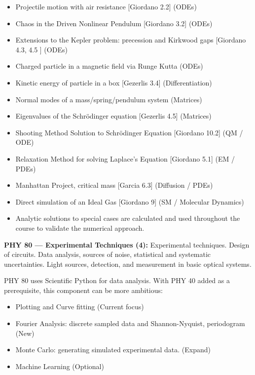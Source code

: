 \documentclass[12pt]{article}
\begin{document}
\begin{itemize}
\item Projectile motion with air resistance [Giordano 2.2] (ODEs)
\item Chaos in the Driven Nonlinear Pendulum [Giordano 3.2] (ODEs) 
\item Extensions to the Kepler problem:  precession and Kirkwood gaps [Giordano 4.3, 4.5 ] (ODEs)
\item Charged particle in a magnetic field via Runge Kutta  (ODEs)
\item Kinetic energy of particle in a box [Gezerlis 3.4] (Differentiation)
\item Normal modes of a mass/spring/pendulum system (Matrices)  
\item Eigenvalues of the Schr\"odinger equation [Gezerlis 4.5] (Matrices)
\item Shooting Method Solution to Schr\"odinger Equation [Giordano 10.2] (QM / ODE)
\item Relaxation Method for solving Laplace's Equation [Giordano 5.1] (EM / PDEs)
\item Manhattan Project, critical mass [Garcia 6.3] (Diffusion / PDEs)
\item Direct simulation of an Ideal Gas [Giordano 9] (SM / Molecular Dynamics)
\item Analytic solutions to special cases are calculated and used throughout the
  course to validate the numerical approach.
\end{itemize}  

\vskip 1cm
\noindent
{\bf PHY 80 --- Experimental Techniques (4):}
Experimental techniques. Design of circuits. Data analysis, sources of
noise, statistical and systematic uncertainties. Light sources,
detection, and measurement in basic optical systems.

PHY 80 uses Scientific Python for data analysis.  With PHY 40 added as
a prerequisite, this component can be more ambitious:
\begin{itemize}
\item Plotting and Curve fitting (Current focus)
\item Fourier Analysis: discrete sampled data and Shannon-Nyquist, periodogram (New)
\item Monte Carlo:  generating simulated experimental data. (Expand)
\item Machine Learning (Optional)
\end{itemize}

\newpage
\end{document}
